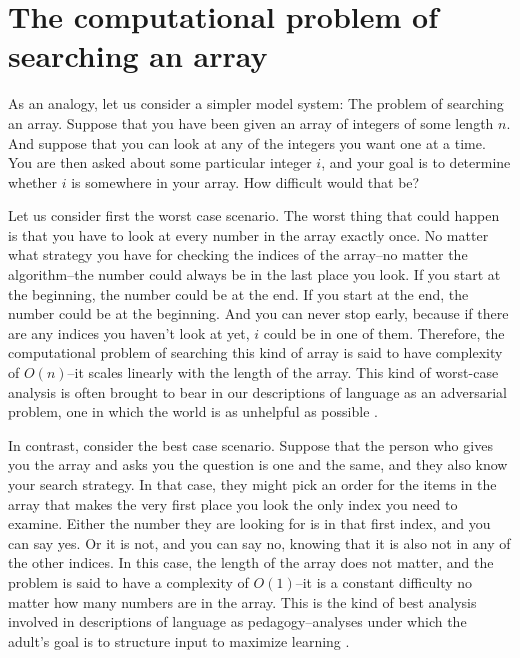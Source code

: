 \documentclass[review]{elsarticle}
\begin{document}
\section{The computational problem of searching an array}

As an analogy, let us consider a simpler model system: The problem of searching an array. Suppose that you have been given an array of integers of some length $n$. And suppose that you can look at any of the integers you want one at a time. You are then asked about some particular integer $i$, and your goal is to determine whether $i$ is somewhere in your array. How difficult would that be? 

Let us consider first the worst case scenario. The worst thing that could happen is that you have to look at every number in the array exactly once. No matter what strategy you have for checking the indices of the array--no matter the algorithm--the number could always be in the last place you look. If you start at the beginning, the number could be at the end. If you start at the end, the number could be at the beginning. And you can never stop early, because if there are any indices you haven't look at yet, $i$ could be in one of them. Therefore, the computational problem of searching this kind of array is said to have complexity of $O\left(n\right)$--it scales linearly with the length of the array. This kind of worst-case analysis is often brought to bear in our descriptions of language as an adversarial problem, one in which the world is as unhelpful as possible \citep[e.g.][]{gold1967, blythe2010}.

In contrast, consider the best case scenario. Suppose that the person who gives you the array and asks you the question is one and the same, and they also know your search strategy. In that case, they might pick an order for the items in the array that makes the very first place you look the only index you need to examine. Either the number they are looking for is in that first index, and you can say yes. Or it is not, and you can say no, knowing that it is also not in any of the other indices. In this case, the length of the array does not matter, and the problem is said to have a complexity of  $O\left(1\right)$--it is a constant difficulty no matter how many numbers are in the array. This is the kind of best analysis involved in descriptions of language as pedagogy--analyses under which the adult's goal is to structure input to maximize learning \citep{bonawitz2011, csibra2009, shafto2012}.
\end{document}
